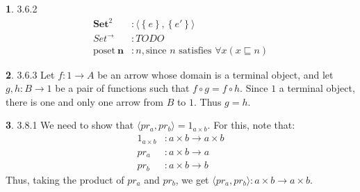 \documentclass{article}
\theoremstyle{definition}
\newcommand{\set}[1]{\left\{#1\right\}}
\newcommand{\Set}{\mathbf{Set}}
\theoremstyle{definition}
\theoremstyle{definition}
\newtheorem{solution-internal}{}[subsection]
\newenvironment{solution}{
  \begin{solution-internal}
}{
  \end{solution-internal}
}
\begin{document}
\begin{solution}
  3.6.2 
  \begin{align*}
    \Set^2 &: \langle \set{e}, \set{e'} \rangle \\
    Set^{\rightarrow} &: TODO \\
    \text{poset}~\mathbf{n} &: n, \text{since $n$ satisfies $\forall x (x \sqsubseteq n)$}
  \end{align*}
\end{solution}

\begin{solution}
  3.6.3 Let $f\colon 1 \to A$ be an arrow whose domain is a terminal object, and
  let $g, h \colon B \to 1$ be a pair of functions such that $f \circ g = f
  \circ h$. Since $1$ a terminal object, there is one and only one arrow from
  $B$ to $1$. Thus $g = h$.
\end{solution}

\begin{solution}
  3.8.1 We need to show that $\langle pr_a, pr_b \rangle = 1_{a \times b}$. For
  this, note that:
  \begin{align*}
    1_{a \times b} &\colon a \times b \to a \times b \\
    pr_a           &\colon a \times b \to a \\
    pr_b           &\colon a \times b \to b
  \end{align*}
  Thus, taking the product of $pr_a$ and $pr_b$, we get $\langle pr_a, pr_b
  \rangle \colon a \times b \to a \times b$.

  \begin{center}
  \end{center}

\end{solution}
\end{document}
